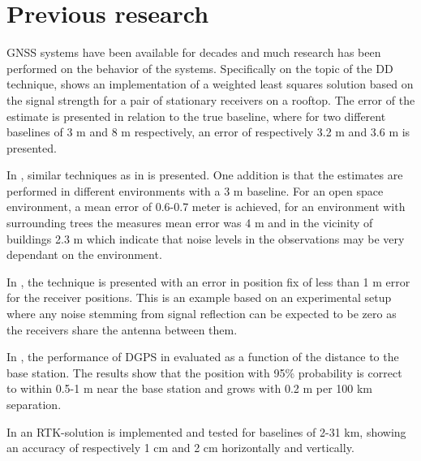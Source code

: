\section{Previous research}\label{previousResearch}
GNSS systems have been available for decades and much research has been performed on the behavior of the systems. Specifically on the topic of the DD technique, \cite{BLUE} shows an implementation of a weighted least squares solution based on the signal strength for a pair of stationary receivers on a rooftop. The error of the estimate is presented in relation to the true baseline, where for two different baselines of 3 m and 8 m respectively, an error of respectively 3.2 m and 3.6 m is presented. 
\par 
In \cite{posAccuracyEnvironment}, similar techniques as in \cite{BLUE} is presented. One addition is that the estimates are performed in different environments with a 3 m baseline. For an open space environment, a mean error of 0.6-0.7 meter is achieved, for an environment with surrounding trees the measures mean error was 4 m and in the vicinity of buildings 2.3 m which indicate that noise levels in the observations may be very dependant on the environment.
\par
In \cite{farrell1999global}, the technique is presented with an error in position fix of less than 1 m error for the receiver positions. This is an example based on an experimental setup where any noise stemming from signal reflection can be expected to be zero as the receivers share the antenna between them.
\par
In \cite{monteiro2005accuracy}, the performance of DGPS in evaluated as a function of the distance to the base station. The results show that the position with 95\% probability is correct to within 0.5-1 m near the base station and grows with 0.2 m per 100 km separation.
\par
In \cite{feng2008gps} an RTK-solution is implemented and tested for baselines of 2-31 km, showing an accuracy of respectively 1 cm and 2 cm horizontally and vertically.

 
